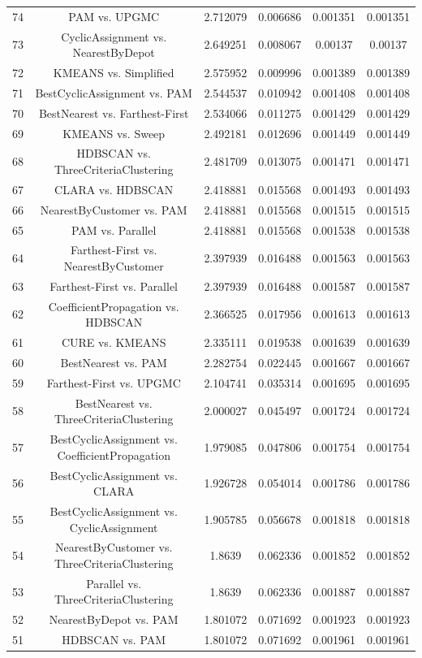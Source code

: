 \documentclass[a4paper,10pt]{article}
\begin{document}
\begin{landscape}
\begin{table}[!htp]
\begin{tabular}{cccccc}
74&PAM vs. UPGMC&2.712079&0.006686&0.001351&0.001351\\
73&CyclicAssignment vs. NearestByDepot&2.649251&0.008067&0.00137&0.00137\\
72&KMEANS vs. Simplified&2.575952&0.009996&0.001389&0.001389\\
71&BestCyclicAssignment vs. PAM&2.544537&0.010942&0.001408&0.001408\\
70&BestNearest vs. Farthest-First&2.534066&0.011275&0.001429&0.001429\\
69&KMEANS vs. Sweep&2.492181&0.012696&0.001449&0.001449\\
68&HDBSCAN vs. ThreeCriteriaClustering&2.481709&0.013075&0.001471&0.001471\\
67&CLARA vs. HDBSCAN&2.418881&0.015568&0.001493&0.001493\\
66&NearestByCustomer vs. PAM&2.418881&0.015568&0.001515&0.001515\\
65&PAM vs. Parallel&2.418881&0.015568&0.001538&0.001538\\
64&Farthest-First vs. NearestByCustomer&2.397939&0.016488&0.001563&0.001563\\
63&Farthest-First vs. Parallel&2.397939&0.016488&0.001587&0.001587\\
62&CoefficientPropagation vs. HDBSCAN&2.366525&0.017956&0.001613&0.001613\\
61&CURE vs. KMEANS&2.335111&0.019538&0.001639&0.001639\\
60&BestNearest vs. PAM&2.282754&0.022445&0.001667&0.001667\\
59&Farthest-First vs. UPGMC&2.104741&0.035314&0.001695&0.001695\\
58&BestNearest vs. ThreeCriteriaClustering&2.000027&0.045497&0.001724&0.001724\\
57&BestCyclicAssignment vs. CoefficientPropagation&1.979085&0.047806&0.001754&0.001754\\
56&BestCyclicAssignment vs. CLARA&1.926728&0.054014&0.001786&0.001786\\
55&BestCyclicAssignment vs. CyclicAssignment&1.905785&0.056678&0.001818&0.001818\\
54&NearestByCustomer vs. ThreeCriteriaClustering&1.8639&0.062336&0.001852&0.001852\\
53&Parallel vs. ThreeCriteriaClustering&1.8639&0.062336&0.001887&0.001887\\
52&NearestByDepot vs. PAM&1.801072&0.071692&0.001923&0.001923\\
51&HDBSCAN vs. PAM&1.801072&0.071692&0.001961&0.001961\\

\end{tabular}
\end{table}
\end{landscape}
\end{document}
